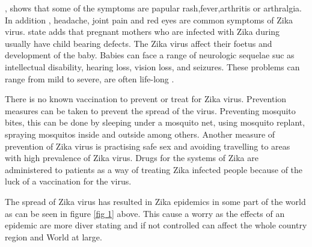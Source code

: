 \cite{musso2015}, shows that some of the symptoms are papular rash,fever,arthritis or arthralgia.
 
In addition ,
headache, joint pain and red eyes are common symptoms of Zika virus. \cite{simoes2016zika}
state adds that pregnant mothers who are infected with Zika during usually have child bearing defects.
The Zika virus affect their foetus and development of the baby.
Babies can face a range of neurologic sequelae suc as intellectual disability, hearing loss, vision loss, and seizures.
These problems can range from mild to severe, are often life-long \citep{rasmussen2016zika}.

There is no known vaccination to prevent or treat for Zika virus.
Prevention measures can be taken to prevent the spread of the virus.
Preventing mosquito bites, this can be done by sleeping under a mosquito net, using mosquito replant, spraying mosquitos inside and outside among others.
Another measure of prevention of Zika virus is practising safe sex and avoiding travelling to areas with high prevalence of Zika virus.
Drugs for the systems of Zika are administered to patients as a way of treating Zika infected people because of the luck of a vaccination for the virus.




The spread of Zika virus has resulted in Zika epidemics in some part of the world as can be seen in figure \ref{fig 1} above.
This cause a worry as the effects of an epidemic are more diver stating and if not controlled can affect the whole country region and World at large. 

